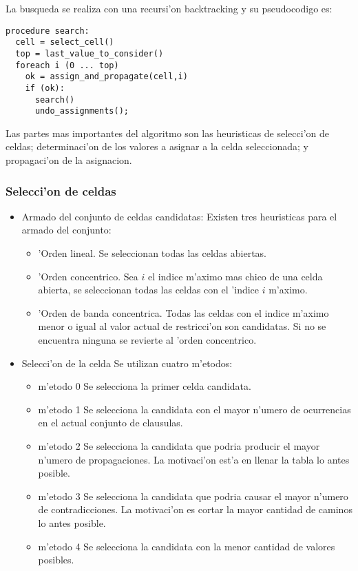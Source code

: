 La busqueda se realiza con una recursi'on backtracking y su pseudocodigo es:

\begin{verbatim}
procedure search:
  cell = select_cell()
  top = last_value_to_consider()
  foreach i (0 ... top)
    ok = assign_and_propagate(cell,i)
    if (ok):
      search()
      undo_assignments();
\end{verbatim}

Las partes mas importantes del algoritmo son las heuristicas de selecci'on de celdas; determinaci'on de los valores a asignar a la celda seleccionada; y propagaci'on de la asignacion.

\subsubsection{Selecci'on de celdas}

\begin{itemize}

\item{Armado del conjunto de celdas candidatas}: Existen tres heuristicas para el armado del conjunto:

\begin{itemize}
\item 'Orden lineal. Se seleccionan todas las celdas abiertas.
\item 'Orden concentrico. Sea $i$ el indice m'aximo mas chico de una celda abierta, se seleccionan todas las celdas con el 'indice $i$ m'aximo.
\item 'Orden de banda concentrica. Todas las celdas con el indice m'aximo menor o igual al valor actual de restricci'on son candidatas. Si no se encuentra ninguna se revierte al 'orden concentrico.
\end{itemize}


\item{Selecci'on de la celda} Se utilizan cuatro m'etodos:

\begin{itemize}
\item{m'etodo 0} Se selecciona la primer celda candidata.
\item{m'etodo 1} Se selecciona la candidata con el mayor n'umero de ocurrencias en el actual conjunto de clausulas.
\item{m'etodo 2} Se selecciona la candidata que podria producir el mayor n'umero de propagaciones. La motivaci'on est'a en llenar la tabla lo antes posible.
\item{m'etodo 3} Se selecciona la candidata que podria causar el mayor n'umero de contradicciones. La motivaci'on es cortar la mayor cantidad de caminos lo antes posible.
\item{m'etodo 4} Se selecciona la candidata con la menor cantidad de valores posibles.
\end{itemize}

\end{itemize}


